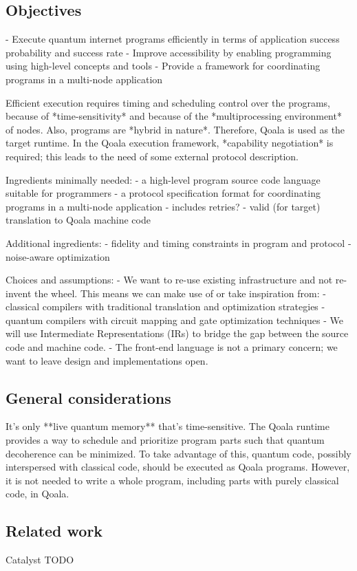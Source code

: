 \subsection{Objectives}
- Execute quantum internet programs efficiently in terms of application success probability and success rate
- Improve accessibility by enabling programming using high-level concepts and tools
- Provide a framework for coordinating programs in a multi-node application

Efficient execution requires timing and scheduling control over the programs, because of *time-sensitivity* and because of the *multiprocessing environment* of nodes.
Also, programs are *hybrid in nature*.
Therefore, Qoala is used as the target runtime.
In the Qoala execution framework, *capability negotiation* is required; this leads to the need of some external protocol description.


Ingredients minimally needed:
- a high-level program source code language suitable for programmers
- a protocol specification format for coordinating programs in a multi-node application
  - includes retries?
- valid (for target) translation to Qoala machine code

Additional ingredients:
- fidelity and timing constraints in program and protocol
- noise-aware optimization


Choices and assumptions:
- We want to re-use existing infrastructure and not re-invent the wheel. This means we can make use of or take inspiration from:
  - classical compilers with traditional translation and optimization strategies
  - quantum compilers with circuit mapping and gate optimization techniques
- We will use Intermediate Representations (IRs) to bridge the gap between the source code and machine code.
- The front-end language is not a primary concern; we want to leave design and implementations open.

\subsection{General considerations}
It's only **live quantum memory** that's time-sensitive.
The Qoala runtime provides a way to schedule and prioritize program parts such that quantum decoherence can be minimized.
To take advantage of this, quantum code, possibly interspersed with classical code, should be executed as Qoala programs.
However, it is not needed to write a whole program, including parts with purely classical code, in Qoala.


\subsection{Related work}
Catalyst
TODO

